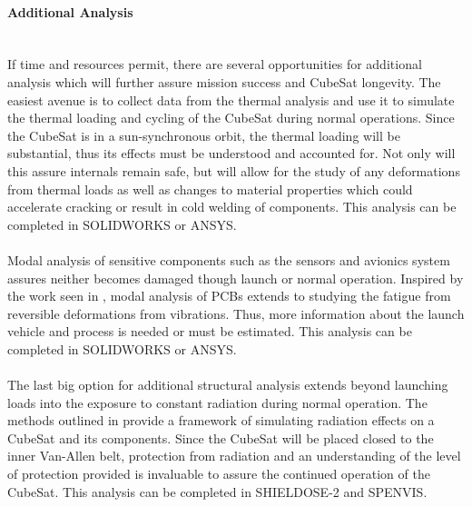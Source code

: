 \paragraph{Additional Analysis} ~\\

If time and resources permit, there are several opportunities for additional analysis which will further assure mission success and CubeSat longevity. The easiest avenue is to collect data from the thermal analysis and use it to simulate the thermal loading and cycling of the CubeSat during normal operations. Since the CubeSat is in a sun-synchronous orbit, the thermal loading will be substantial, thus its effects must be understood and accounted for. Not only will this assure internals remain safe, but will allow for the study of any deformations from thermal loads as well as changes to material properties which could accelerate cracking or result in cold welding of components. This analysis can be completed in SOLIDWORKS or ANSYS.
~\\~\\
Modal analysis of sensitive components such as the sensors and avionics system assures neither becomes damaged though launch or normal operation. Inspired by the work seen in \cite{FEA7}, modal analysis of PCBs extends to studying the fatigue from reversible deformations from vibrations. Thus, more information about the launch vehicle and process is needed or must be estimated. This analysis can be completed in SOLIDWORKS or ANSYS.
~\\~\\
The last big option for additional structural analysis extends beyond launching loads into the exposure to constant radiation during normal operation. The methods outlined in \cite{SCRP} provide a framework of simulating radiation effects on a CubeSat and its components. Since the CubeSat will be placed closed to the inner Van-Allen belt, protection from radiation and an understanding of the level of protection provided is invaluable to assure the continued operation of the CubeSat. This analysis can be completed in SHIELDOSE-2 and SPENVIS.
